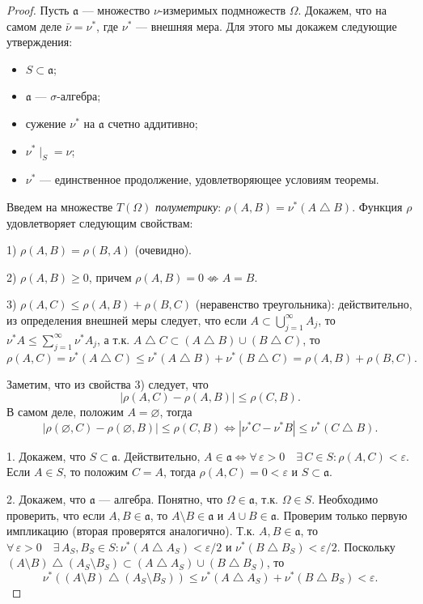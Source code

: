 \documentclass[12pt,titlepage]{article}
\theoremstyle{definition}
\begin{document}
\begin{proof}
Пусть $\mathfrak{a}$ --- множество $\nu$-измеримых подмножеств
$\Omega$. Докажем, что на самом деле $\bar{\nu}=\nu^*$, где $\nu^*$
--- внешняя мера. Для этого мы докажем следующие утверждения:

\begin{itemize}
  \item $S\subset\mathfrak{a}$;
  \item $\mathfrak{a}$ --- $\sigma$-алгебра;
  \item сужение $\nu^*$ на $\mathfrak{a}$ счетно аддитивно;
  \item $\nu^*\mid_S=\nu$;
  \item $\nu^*$ --- единственное продолжение, удовлетворяющее
  условиям теоремы.
\end{itemize}

Введем на множестве $T(\Omega)$ \emph{полуметрику}:
$\rho(A,B)=\nu^*(A\bigtriangleup B)$. Функция $\rho$ удовлетворяет
следующим свойствам:

1) $\rho(A,B)=\rho(B,A)$ (очевидно).

2) $\rho(A, B)\geqslant 0$, причем $\rho(A,B)=0\nLeftrightarrow
A=B$.

3) $\rho(A,C)\leqslant\rho(A,B)+\rho(B,C)$ (неравенство
треугольника): действительно, из определения внешней меры следует,
что если $A\subset\bigcup\limits_{j=1}^\infty A_j$, то
$\nu^*A\leqslant\sum\limits_{j=1}^\infty \nu^*A_j$, а т.к.
$A\bigtriangleup C\subset(A\bigtriangleup B)\cup(B\bigtriangleup
C)$, то $$\rho(A,C)=\nu^*(A\bigtriangleup
C)\leqslant\nu^*(A\bigtriangleup B)+\nu^*(B\bigtriangleup
C)=\rho(A,B)+\rho(B,C).$$

Заметим, что из свойства 3) следует, что
$$|\rho(A,C)-\rho(A,B)|\leqslant\rho(C,B).$$ В самом деле, положим
$A=\varnothing$, тогда $$|\rho(\varnothing,C)-\rho(\varnothing,
B)|\leqslant\rho(C,B)\Leftrightarrow
|\nu^*C-\nu^*B|\leqslant\nu^*(C\bigtriangleup B).$$

1. Докажем, что $S\subset\mathfrak{a}$. Действительно,
$A\in\mathfrak{a}\Leftrightarrow\forall\,\varepsilon>0\quad\exists\,
C\in S:\rho(A,C)<\varepsilon$. Если $A\in S$, то положим $C=A$,
тогда $\rho(A,C)=0<\varepsilon$ и $S\subset\mathfrak{a}$.

2. Докажем, что $\mathfrak{a}$ --- алгебра. Понятно, что
$\Omega\in\mathfrak{a}$, т.к. $\Omega\in S$. Необходимо проверить,
что если $A,B\in\mathfrak{a}$, то $A\setminus B\in\mathfrak{a}$ и
$A\cup B\in\mathfrak{a}$. Проверим только первую импликацию (вторая
проверятся аналогично). Т.к. $A,B\in\mathfrak{a}$, то
$\forall\,\varepsilon>0\quad\exists\, A_S,B_S\in S:
\nu^*(A\bigtriangleup A_S)<\varepsilon/2$ и $\nu^*(B\bigtriangleup
B_S)<\varepsilon/2$. Поскольку $(A\setminus
B)\bigtriangleup(A_S\setminus B_S)\subset(A\bigtriangleup
A_S)\cup(B\bigtriangleup B_S)$, то $$\nu^*((A\setminus
B)\bigtriangleup(A_S\setminus B_S))\leqslant\nu^*(A\bigtriangleup
A_S)+\nu^*(B\bigtriangleup B_S)<\varepsilon.$$


\end{proof}
\end{document}
